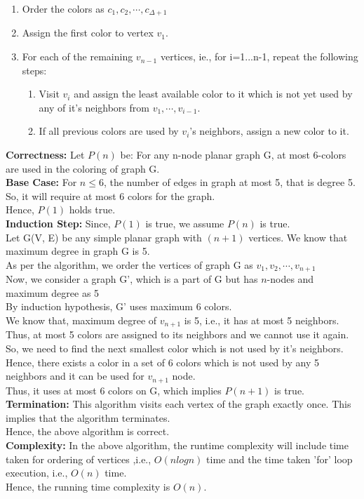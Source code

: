 \documentclass[12pt]{article}
\begin{document}
\begin{enumerate}
\begin{enumerate}
\begin{enumerate}
\item Order the colors as $c_1,c_2,\cdots,c_{\Delta+1}$\\
\item Assign the first color to vertex $v_1$.\\
\item For each of the remaining $v_{n-1}$ vertices, ie., for i=1...n-1, repeat the following steps:\\
\begin{enumerate}
\item Visit $v_i$ and assign the least available color to it which is not yet used by any of it's neighbors from $v_1,\cdots,v_{i-1}$. \\
\item If all previous colors are used by $v_i$'s neighbors, assign a new color to it.\\
\end{enumerate}
\end{enumerate}
\textbf{Correctness:} Let $P(n)$ be: For any n-node planar graph G,  at most 6-colors are used in the coloring of graph G.\\
\textbf{Base Case:} For $n \le 6$, the number of edges in graph at most 5, that is degree 5.\\
So, it will require at most 6 colors for the graph.\\
Hence, $P(1)$ holds true.\\
\textbf{Induction Step:} Since, $P(1)$ is true, we assume $P(n)$ is true.\\
Let G(V, E) be any simple planar graph with $(n+1)$ vertices. We know that maximum degree in graph G is 5.\\
As per the algorithm, we order the vertices of graph G as $v_1, v_2, \cdots, v_{n+1}$ \\
Now, we consider a graph G', which is a part of G but has $n$-nodes and maximum degree as 5\\
By induction hypothesis, G' uses maximum 6 colors.\\
We know that, maximum degree of $v_{n+1}$ is 5, i.e., it has at most 5 neighbors. Thus, at most 5 colors are assigned to its neighbors and we cannot use it again.\\
So, we need to find the next smallest color which is not used by it's neighbors. Hence, there exists a color in a set of 6 colors which is not used by any 5 neighbors and it can be used for $v_{n+1}$ node.\\
Thus, it uses at most 6 colors on G, which implies $P(n+1)$ is true.\\
\textbf{Termination:} This algorithm visits each vertex of the graph exactly once. This implies that the algorithm terminates.\\
Hence, the above algorithm is correct.\\
\textbf{Complexity:} In the above algorithm, the runtime complexity will include time taken for ordering of vertices ,i.e., $O(nlogn)$ time and the time taken 'for' loop execution, i.e., $O(n)$ time.\\
Hence, the running time complexity is $O(n)$.\\


\end{enumerate}
\end{enumerate}
\end{document}
